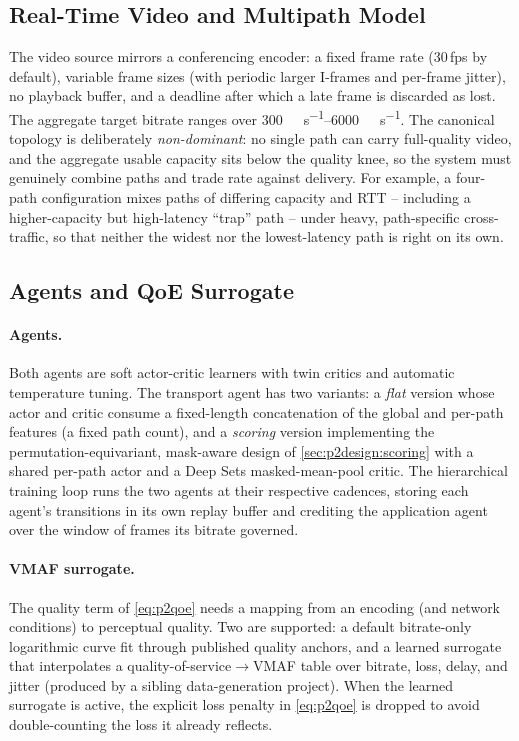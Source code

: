 \subsection{Real-Time Video and Multipath Model}
\label{sec:p2impl:rt}

The video source mirrors a conferencing encoder: a fixed frame rate (30\,fps by default), variable
frame sizes (with periodic larger I-frames and per-frame jitter), no playback buffer, and a deadline
after which a late frame is discarded as lost. The aggregate target bitrate ranges over
\SIrange{300}{6000}{\kilo\bit\per\second}. The canonical topology is deliberately \emph{non-dominant}: no
single path can carry full-quality video, and the aggregate usable capacity sits below the quality knee,
so the system must genuinely combine paths and trade rate against delivery. For example, a four-path
configuration mixes paths of differing capacity and RTT -- including a higher-capacity but high-latency
``trap'' path -- under heavy, path-specific cross-traffic, so that neither the widest nor the
lowest-latency path is right on its own.

\subsection{Agents and QoE Surrogate}
\label{sec:p2impl:agents}

\paragraph{Agents.} Both agents are soft actor-critic learners with twin critics and automatic
temperature tuning. The transport agent has two variants: a \emph{flat} version whose actor and critic
consume a fixed-length concatenation of the global and per-path features (a fixed path count), and a
\emph{scoring} version implementing the permutation-equivariant, mask-aware design of
\cref{sec:p2design:scoring} with a shared per-path actor and a Deep Sets masked-mean-pool critic. The
hierarchical training loop runs the two agents at their respective cadences, storing each agent's
transitions in its own replay buffer and crediting the application agent over the window of frames its
bitrate governed.

\paragraph{VMAF surrogate.} The quality term of \cref{eq:p2qoe} needs a mapping from an encoding (and
network conditions) to perceptual quality. Two are supported: a default bitrate-only logarithmic curve fit
through published quality anchors, and a learned surrogate that interpolates a
quality-of-service$\rightarrow$VMAF table over bitrate, loss, delay, and jitter (produced by a sibling
data-generation project). When the learned surrogate is active, the explicit loss penalty in
\cref{eq:p2qoe} is dropped to avoid double-counting the loss it already reflects.

